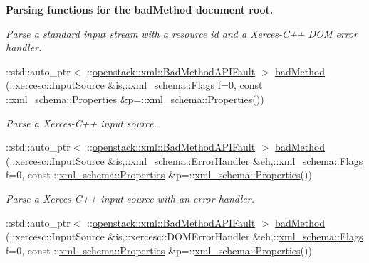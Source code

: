 \begin{Indent}{\bf Parsing functions for the badMethod document root.}
\begin{DoxyCompactItemize}
\begin{DoxyCompactList}\small\item\em Parse a standard input stream with a resource id and a Xerces-\/C++ DOM error handler. \item\end{DoxyCompactList}\item 
::std::auto\_\-ptr$<$ ::\hyperlink{classopenstack_1_1xml_1_1BadMethodAPIFault}{openstack::xml::BadMethodAPIFault} $>$ \hyperlink{namespaceopenstack_1_1xml_aa1ba2e3ea203a9b959afb6b3b3521591}{badMethod} (::xercesc::InputSource \&is,::\hyperlink{namespacexml__schema_affb4c227cbd9aa7453dd1dc5a1401943}{xml\_\-schema::Flags} f=0, const ::\hyperlink{namespacexml__schema_ad27ce19a7ee1d3b1064092648898f64c}{xml\_\-schema::Properties} \&p=::\hyperlink{namespacexml__schema_ad27ce19a7ee1d3b1064092648898f64c}{xml\_\-schema::Properties}())
\begin{DoxyCompactList}\small\item\em Parse a Xerces-\/C++ input source. \item\end{DoxyCompactList}\item 
::std::auto\_\-ptr$<$ ::\hyperlink{classopenstack_1_1xml_1_1BadMethodAPIFault}{openstack::xml::BadMethodAPIFault} $>$ \hyperlink{namespaceopenstack_1_1xml_a1e1de6541c240a00a1a21bf8dea9ff5b}{badMethod} (::xercesc::InputSource \&is,::\hyperlink{namespacexml__schema_ab1c9361bfd3b404eaabf0c31eded79dc}{xml\_\-schema::ErrorHandler} \&eh,::\hyperlink{namespacexml__schema_affb4c227cbd9aa7453dd1dc5a1401943}{xml\_\-schema::Flags} f=0, const ::\hyperlink{namespacexml__schema_ad27ce19a7ee1d3b1064092648898f64c}{xml\_\-schema::Properties} \&p=::\hyperlink{namespacexml__schema_ad27ce19a7ee1d3b1064092648898f64c}{xml\_\-schema::Properties}())
\begin{DoxyCompactList}\small\item\em Parse a Xerces-\/C++ input source with an error handler. \item\end{DoxyCompactList}\item 
::std::auto\_\-ptr$<$ ::\hyperlink{classopenstack_1_1xml_1_1BadMethodAPIFault}{openstack::xml::BadMethodAPIFault} $>$ \hyperlink{namespaceopenstack_1_1xml_afb54ab36f83b5b6666b87482bfb5f7e4}{badMethod} (::xercesc::InputSource \&is,::xercesc::DOMErrorHandler \&eh,::\hyperlink{namespacexml__schema_affb4c227cbd9aa7453dd1dc5a1401943}{xml\_\-schema::Flags} f=0, const ::\hyperlink{namespacexml__schema_ad27ce19a7ee1d3b1064092648898f64c}{xml\_\-schema::Properties} \&p=::\hyperlink{namespacexml__schema_ad27ce19a7ee1d3b1064092648898f64c}{xml\_\-schema::Properties}())

\end{DoxyCompactItemize}
\end{Indent}
